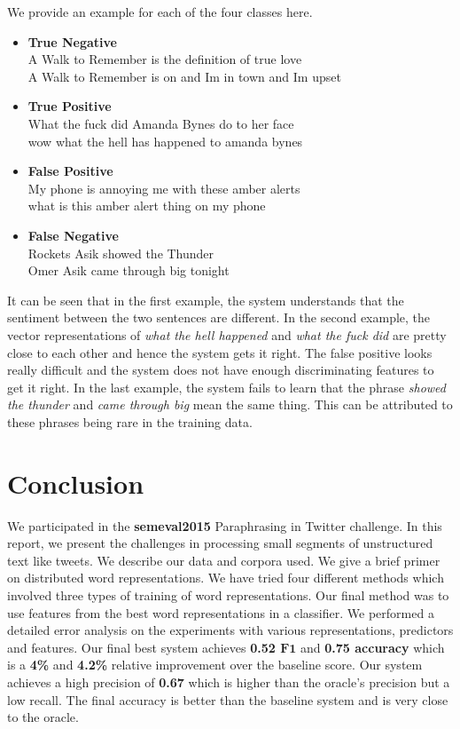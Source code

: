 \documentclass[conference]{IEEEtran}
\begin{document}
\indent We provide an example for each of the four classes here.\\
\begin{itemize}
\item
\textbf{True Negative}\\
A Walk to Remember is the definition of true love\\
A Walk to Remember is on and Im in town and Im upset\\
\item
\textbf{True Positive}\\
What the fuck did Amanda Bynes do to her face\\
wow what the hell has happened to amanda bynes\\
\item
\textbf{False Positive}\\
My phone is annoying me with these amber alerts\\
what is this amber alert thing on my phone\\
\item
\textbf{False Negative}\\
Rockets Asik showed the Thunder\\
Omer Asik came through big tonight\\
\end{itemize}
It can be seen that in the first example, the system understands that the sentiment between the two sentences are different. In the second example, the vector representations of \emph{what the hell happened} and \emph{what the fuck did} are pretty close to each other and hence the system gets it right. The false positive looks really difficult and the system does not have enough discriminating features to get it right. In the last example, the system fails to learn that the phrase \emph{showed the thunder} and \emph{came through big} mean the same thing. This can be attributed to these phrases being rare in the training data.\\

\section{Conclusion}
We participated in the \textbf{semeval2015} Paraphrasing in Twitter challenge. In this report, we present the challenges in processing small segments of unstructured text like tweets. We describe our data and corpora used. We give a brief primer on distributed word representations. We have tried four different methods which involved three types of training of word representations. Our final method was to use features from the best word representations in a classifier. We performed a detailed error analysis on the experiments with various representations, predictors and features. Our final best system achieves \textbf{0.52 $\textbf{F1}$} and \textbf{0.75 accuracy} which is a \textbf{4\%} and  \textbf{4.2\%} relative improvement over the baseline score. Our system achieves a high precision of \textbf{0.67} which is higher than the oracle's precision but a low recall. The final accuracy is better than the baseline system and is very close to the oracle.\\
\end{document}

